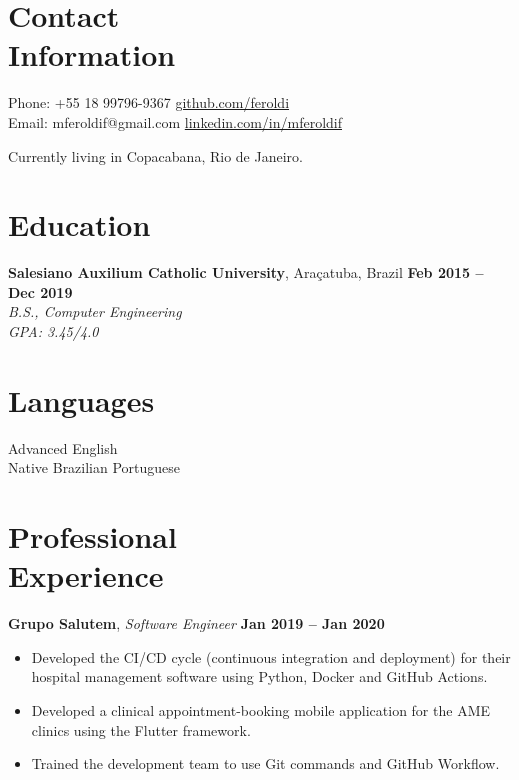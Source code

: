 \documentclass[margin,line]{resume}
\begin{document}
\begin{resume}
    \section{\mysidestyle Contact\\Information}

    Phone: +55 18 99796-9367 \hfill \url{github.com/feroldi}\\
    \noindent Email: mferoldif@gmail.com \hfill \url{linkedin.com/in/mferoldif}

    Currently living in Copacabana, Rio de Janeiro.

    \section{\mysidestyle Education}

    \textbf{Salesiano Auxilium Catholic University}, Araçatuba, Brazil \hfill \textbf{Feb 2015 -- Dec 2019}\\
    \textsl{B.S., Computer Engineering}\\
    \textsl{GPA: 3.45/4.0}

    \section{\mysidestyle Languages}

    Advanced English\\
    Native Brazilian Portuguese

    \section{\mysidestyle Professional\\Experience}

    \textbf{Grupo Salutem}, \textit{Software Engineer} \hfill \textbf{Jan 2019 -- Jan 2020}
    \begin{itemize}
        \item Developed the CI/CD cycle (continuous integration and deployment) for their hospital management software using Python, Docker and GitHub Actions.
        \item Developed a clinical appointment-booking mobile application for the AME clinics using the Flutter framework.
        \item Trained the development team to use Git commands and GitHub Workflow.
    \end{itemize}


\end{resume}
\end{document}
